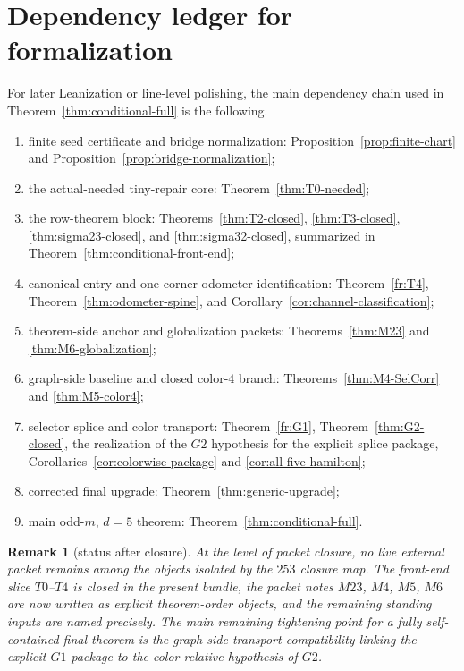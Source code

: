 \documentclass[11pt]{article}
\newtheorem{remark}[theorem]{Remark}
\begin{document}
\section{Dependency ledger for formalization}

For later Leanization or line-level polishing, the main dependency chain used in
Theorem~\ref{thm:conditional-full} is the following.
\begin{enumerate}[label=\textup{(D\arabic*)},leftmargin=3.0em]
\item finite seed certificate and bridge normalization:
      Proposition~\ref{prop:finite-chart} and
      Proposition~\ref{prop:bridge-normalization};
\item the actual-needed tiny-repair core:
      Theorem~\ref{thm:T0-needed};
\item the row-theorem block:
      Theorems~\ref{thm:T2-closed}, \ref{thm:T3-closed},
      \ref{thm:sigma23-closed}, and \ref{thm:sigma32-closed}, summarized in
      Theorem~\ref{thm:conditional-front-end};
\item canonical entry and one-corner odometer identification:
      Theorem~\ref{fr:T4}, Theorem~\ref{thm:odometer-spine}, and
      Corollary~\ref{cor:channel-classification};
\item theorem-side anchor and globalization packets:
      Theorems~\ref{thm:M23} and \ref{thm:M6-globalization};
\item graph-side baseline and closed color-$4$ branch:
      Theorems~\ref{thm:M4-SelCorr} and \ref{thm:M5-color4};
\item selector splice and color transport:
      Theorem~\ref{fr:G1}, Theorem~\ref{thm:G2-closed},
      the realization of the \(G2\) hypothesis for the explicit splice package,
      Corollaries~\ref{cor:colorwise-package} and
      \ref{cor:all-five-hamilton};
\item corrected final upgrade:
      Theorem~\ref{thm:generic-upgrade};
\item main odd-$m$, $d=5$ theorem:
      Theorem~\ref{thm:conditional-full}.
\end{enumerate}

\begin{remark}[status after closure]
At the level of packet closure, no live external packet remains among the
objects isolated by the \(253\) closure map.
The front-end slice $T0$--$T4$ is closed in the present bundle, the packet notes
\(M23\), \(M4\), \(M5\), \(M6\) are now written as explicit theorem-order
objects, and the remaining standing inputs are named precisely.
The main remaining tightening point for a fully self-contained final theorem is
the graph-side transport compatibility linking the explicit \(G1\) package to
the color-relative hypothesis of \(G2\).
\end{remark}
\end{document}
